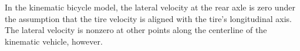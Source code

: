 
In the kinematic bicycle model, the lateral velocity at the rear axle is zero under the assumption that the tire velocity is aligned with the tire’s longitudinal axis. The lateral velocity is nonzero at other points along the centerline of the kinematic vehicle, however.

\vspace*{0.5cm}

